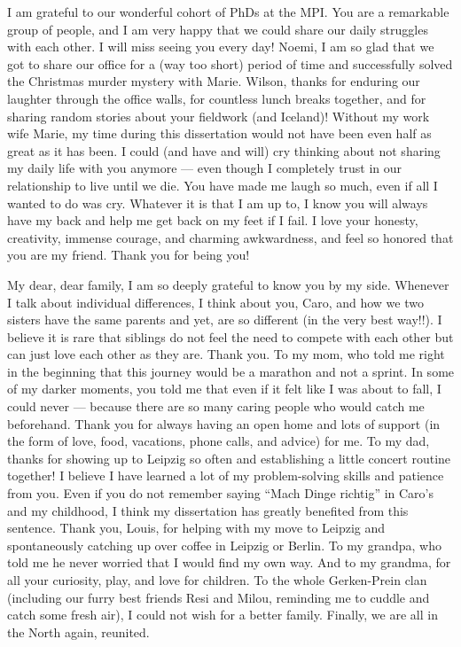 \documentclass[
]{scrbook}
\begin{document}
I am grateful to our wonderful cohort of PhDs at the MPI. You are a remarkable group of people, and I am very happy that we could share our daily struggles with each other. I will miss seeing you every day! Noemi, I am so glad that we got to share our office for a (way too short) period of time and successfully solved the Christmas murder mystery with Marie. Wilson, thanks for enduring our laughter through the office walls, for countless lunch breaks together, and for sharing random stories about your fieldwork (and Iceland)! Without my work wife Marie, my time during this dissertation would not have been even half as great as it has been. I could (and have and will) cry thinking about not sharing my daily life with you anymore --- even though I completely trust in our relationship to live until we die. You have made me laugh so much, even if all I wanted to do was cry. Whatever it is that I am up to, I know you will always have my back and help me get back on my feet if I fail. I love your honesty, creativity, immense courage, and charming awkwardness, and feel so honored that you are my friend. Thank you for being you!

My dear, dear family, I am so deeply grateful to know you by my side. Whenever I talk about individual differences, I think about you, Caro, and how we two sisters have the same parents and yet, are so different (in the very best way!!). I believe it is rare that siblings do not feel the need to compete with each other but can just love each other as they are. Thank you. To my mom, who told me right in the beginning that this journey would be a marathon and not a sprint. In some of my darker moments, you told me that even if it felt like I was about to fall, I could never --- because there are so many caring people who would catch me beforehand. Thank you for always having an open home and lots of support (in the form of love, food, vacations, phone calls, and advice) for me. To my dad, thanks for showing up to Leipzig so often and establishing a little concert routine together! I believe I have learned a lot of my problem-solving skills and patience from you. Even if you do not remember saying ``Mach Dinge richtig'' in Caro's and my childhood, I think my dissertation has greatly benefited from this sentence. Thank you, Louis, for helping with my move to Leipzig and spontaneously catching up over coffee in Leipzig or Berlin. To my grandpa, who told me he never worried that I would find my own way. And to my grandma, for all your curiosity, play, and love for children. To the whole Gerken-Prein clan (including our furry best friends Resi and Milou, reminding me to cuddle and catch some fresh air), I could not wish for a better family. Finally, we are all in the North again, reunited.
\end{document}
